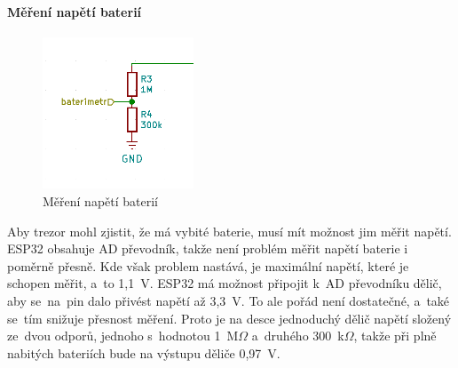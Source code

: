 \newpage

\paragraph*{Měření napětí baterií}

\begin{figure}
    \centering
    \includegraphics[width=0.4\textwidth]{kapitoly/obrazky/E4/napajeni/delic_baterimetru.png}
    \caption{Měření napětí baterií\label{fig:baterimetr}}
\end{figure}

Aby trezor mohl zjistit, že má vybité baterie, musí mít možnost jim měřit napětí. ESP32 obsahuje AD převodník, takže není problém měřit napětí baterie 
i poměrně přesně. Kde však problem nastává, je maximální napětí, které je schopen měřit, a~to 1,1~V. ESP32 má možnost připojit k~AD převodníku dělič,
aby se~na~pin dalo přivést napětí až 3,3~V. To ale pořád není dostatečné, a~také se~tím snižuje přesnost měření. Proto je na desce jednoduchý dělič napětí
složený ze~dvou odporů, jednoho s~hodnotou 1~M$\Omega$ a~druhého 300~k$\Omega$, takže při plně nabitých bateriích bude na výstupu děliče 0,97~V. %